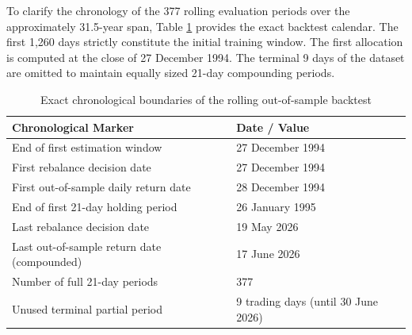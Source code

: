 \documentclass[smallcondensed]{svjour3}
\begin{document}
To clarify the chronology of the 377 rolling evaluation periods over the approximately 31.5-year span, Table \ref{tab:timeline} provides the exact backtest calendar. The first 1,260 days strictly constitute the initial training window. The first allocation is computed at the close of 27 December 1994. The terminal 9 days of the dataset are omitted to maintain equally sized 21-day compounding periods.

\begin{table}[!htbp]
\centering
\caption{Exact chronological boundaries of the rolling out-of-sample backtest}
\label{tab:timeline}
\begin{tabular}{ll}
\toprule
\textbf{Chronological Marker} & \textbf{Date / Value} \\
\midrule
End of first estimation window & 27 December 1994 \\
First rebalance decision date & 27 December 1994 \\
First out-of-sample daily return date & 28 December 1994 \\
End of first 21-day holding period & 26 January 1995 \\
Last rebalance decision date & 19 May 2026 \\
Last out-of-sample return date (compounded) & 17 June 2026 \\
Number of full 21-day periods & 377 \\
Unused terminal partial period & 9 trading days (until 30 June 2026) \\
\bottomrule
\end{tabular}
\end{table}
\end{document}
